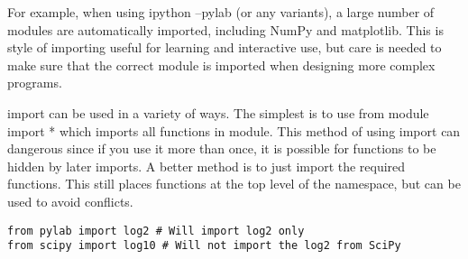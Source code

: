 \documentclass[11pt]{article} %
\begin{document}
For example, when using ipython --pylab (or any variants), a large number
of modules are automatically imported, including NumPy and matplotlib. This is style of importing useful
for learning and interactive use, but care is needed to make sure that the correct module is imported when
designing more complex programs.

import can be used in a variety of ways. The simplest is to use from module import * which imports
all functions in module. This method of using import can dangerous since if you use it more than once,
it is possible for functions to be hidden by later imports. A better method is to just import the required
functions. This still places functions at the top level of the namespace, but can be used to avoid conflicts.
\begin{verbatim}
from pylab import log2 # Will import log2 only
from scipy import log10 # Will not import the log2 from SciPy
\end{verbatim}
\end{document}
